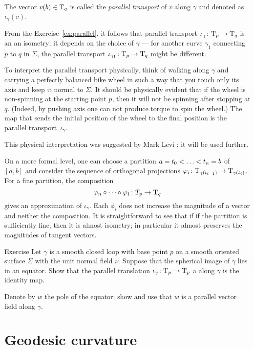 The vector $v(b)\in\mathrm{T}_q$ is called the \emph{parallel transport} of $v$ along $\gamma$ and denoted as $\iota_\gamma(v)$.

From the Exercise~\ref{ex:parallel}, it follows that parallel transport $\iota_\gamma\:\T_p\z\to\T_q$ is an an isometry;
it depends on the choice of $\gamma$ --- for another curve $\gamma_1$ connecting $p$ to $q$ in $\Sigma$, the parallel transport $\iota_{\gamma_1}\colon\mathrm{T}_p\to\mathrm{T}_q$ might be different.

To interpret the parallel transport physically, 
think of walking along $\gamma$ and carrying a perfectly balanced bike wheel in such a way that you touch only its axis and keep it normal to $\Sigma$.
It should be physically evident that if the wheel is non-spinning at the starting point $p$, then it will not be spinning after stopping at $q$.
(Indeed, by pushing axis one can not produce torque to spin the wheel.)
The map that sends the initial position of the wheel to the final position is  the parallel transport~$\iota_\gamma$.

This physical interpretation was suggested by Mark Levi \cite{levi};
it will be used further.

On a more formal level, one can choose a partition $a=t_0<\dots\z<t_n=b$ of $[a,b]$
and consider the sequence of orthogonal projections $\varphi_i\colon\mathrm{T}_{\gamma(t_{i-1})}\to\mathrm{T}_{\gamma(t_i)}$.
For a fine partition, the composition 
\[\phi_n\circ\dots\circ\phi_1\:T_p\z\to\T_q\]
gives an approximation of $\iota_\gamma$.
Each $\phi_i$ does not increase the magnitude of a vector and neither the composition.
It is straightforward to see that if if the partition is sufficiently fine, then it is almost isometry; in particular it almost preserves the magnitudes of tangent vectors.

\begin{thm}{Exercise}
Let $\gamma$ is a smooth closed loop with base point $p$ on a smooth oriented surface $\Sigma$ with the unit normal field $\nu$.
Suppose that the spherical image of $\gamma$ lies in an equator.
Show that the parallel translation $\iota_\gamma\colon\mathrm{T}_p\to \mathrm{T}_p$ a along $\gamma$ is the identity map.
\end{thm}

 Denote by $w$ the pole of the equator; show and use that $w$ is a parallel vector field along $\gamma$.

\section*{Geodesic curvature}


